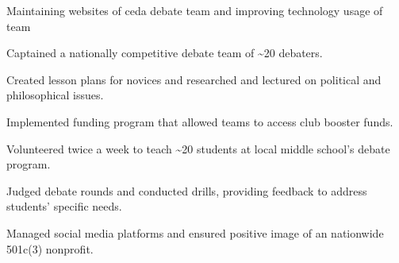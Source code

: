 \documentclass[letterpaper]{resume-shreeram}
\begin{document}
\begin{compactitem}
  \item
    Maintaining websites of ceda debate team and improving technology usage of team
\end{compactitem}

\begin{compactitem}
  \item
    Captained a nationally competitive debate team of \textasciitilde{}20 debaters.

  \item
    Created lesson plans for novices and researched and lectured on political and philosophical issues.

  \item
    Implemented funding program that allowed teams to access club booster funds.
\end{compactitem}

\begin{compactitem}
  \item
    Volunteered twice a week to teach \textasciitilde{}20 students at local middle school's debate program.

  \item
    Judged debate rounds and conducted drills, providing feedback to address students' specific needs.
\end{compactitem}

\begin{compactitem}
  \item
    Managed social media platforms and ensured positive image of an nationwide 501c(3) nonprofit.
\end{compactitem}
\end{document}
